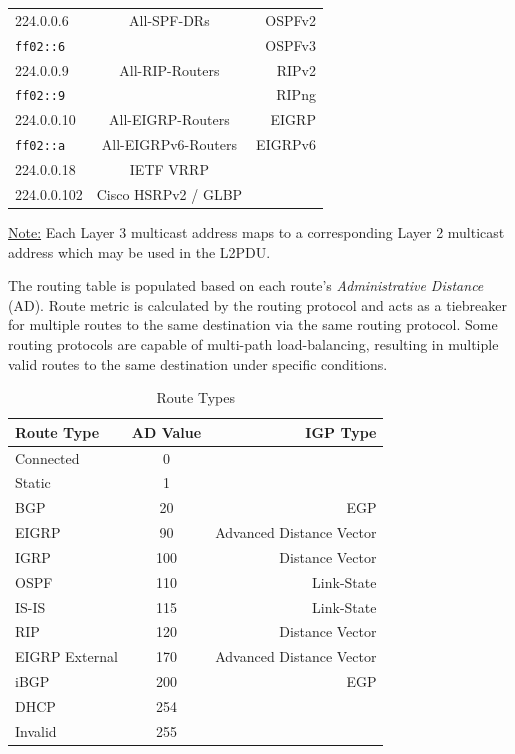 \documentclass[12pt]{article}
\newif\ifcolor											%
\newcommand{\note}[1]{\ifcolor \colorbox{#1}{Note:}\else \underline{Note:}\fi}
\begin{document}
\begin{table}[H]
\begin{minipage}{.6\linewidth}
\begin{tabular}{| l | c | r |}
	224.0.0.6		& All-SPF-DRs		& OSPFv2\\
	\texttt{ff02::6}	&				& OSPFv3\\\hline
	224.0.0.9		& All-RIP-Routers		& RIPv2\\
	\texttt{ff02::9}	&				& RIPng\\\hline
	224.0.0.10		& All-EIGRP-Routers	& EIGRP\\
	\texttt{ff02::a}	& All-EIGRPv6-Routers	& EIGRPv6\\\hline
	224.0.0.18		& IETF VRRP		&\\\hline
	224.0.0.102		& Cisco HSRPv2 / GLBP	&\\\hline
	\end{tabular}\end{minipage}\end{table}
	\note{Goldenrod} Each Layer 3 multicast address maps to a corresponding Layer 2 multicast address which may be used in the L2PDU.

	The routing table is populated based on each route's \textit{Administrative Distance} (AD). Route metric is calculated by the routing protocol and acts as a tiebreaker for multiple routes to the same destination via the same routing protocol. Some routing protocols are capable of multi-path load-balancing, resulting in multiple valid routes to the same destination under specific conditions.

	\begin{table}[H]
	\centering
	\caption{Route Types \label{tab:ROUTE TYPES}}
	\begin{tabular}{@{} l c r @{}}\hline
	\textbf{Route Type}	& \textbf{AD Value}	& \textbf{IGP Type}\\\hline
	Connected 			& 0				&\\
	Static				& 1				&\\
	BGP				& 20				& EGP\\
	EIGRP				& 90				& Advanced Distance Vector\\
	IGRP				& 100				& Distance Vector\\
	OSPF				& 110				& Link-State\\
	IS-IS				& 115				& Link-State\\
	RIP				& 120				& Distance Vector\\
	EIGRP External		& 170				& Advanced Distance Vector\\
	iBGP				& 200				& EGP\\
	DHCP			& 254				&\\
	Invalid			& 255				&\\\hline
	\end{tabular}\end{table}
\end{document}

